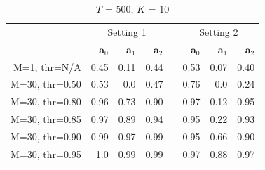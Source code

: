 \documentclass[conference]{IEEEtran}
\newcommand{\p}[1]{{\color{blue} Pdj: #1}}
\begin{document}
\begin{table}[h!]
  \begin{center}
    \renewcommand{\arraystretch}{1.2}
    \begin{tabular}{@{}r rrr c rrr@{}}
      \toprule
      & \multicolumn{3}{c}{Setting 1} & & \multicolumn{3}{c}{Setting 2} \\
      \cmidrule{2-4} \cmidrule{6-8}
                       & $\mathbf{a}_0$ & $\mathbf{a}_1$  & $\mathbf{a}_2$  && $\mathbf{a}_0$  & $\mathbf{a}_1$  & $\mathbf{a}_2$  \\
      \midrule
      {M=1, \hfill thr=N/A}
                       & 0.45  & 0.11  & 0.44  && 0.53  & 0.07  & 0.40  \\
      {M=30, thr=0.50} & 0.53  & 0.0   & 0.47  && 0.76  & 0.0   & 0.24  \\
      {M=30, thr=0.80} & 0.96  & 0.73  & 0.90  && 0.97  & 0.12  & 0.95  \\
      {M=30, thr=0.85} & 0.97  & 0.89  & 0.94  && 0.95  & 0.22  & 0.93  \\
      {M=30, thr=0.90} & 0.99  & 0.97  & 0.99  && 0.95  & 0.66  & 0.90  \\
      {M=30, thr=0.95} & 1.0   & 0.99  & 0.99  && 0.97  & 0.88  & 0.97  \\
      \bottomrule
    \end{tabular}
    \caption{$T$ = 500, $K$ = 10}
    \label{tab:1}
  \end{center}
\end{table}
\end{document}
